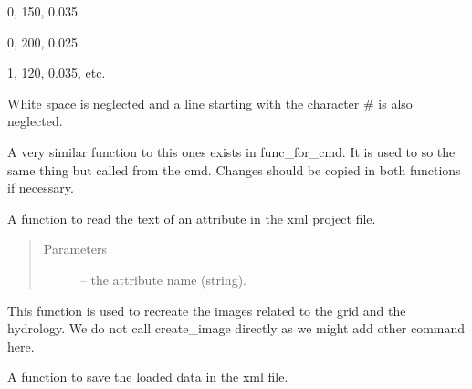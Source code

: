 \documentclass[letterpaper,10pt,english]{sphinxmanual}
\begin{document}
\begin{fulllineitems}
\begin{fulllineitems}
0, 150, 0.035

0, 200, 0.025

1, 120, 0.035, etc.

White space is neglected and a line starting with the character \# is also neglected.

A very similar function to this ones exists in func\_for\_cmd. It is used to so the same thing but called
from the cmd. Changes should be copied in both functions if necessary.

\end{fulllineitems}


\begin{fulllineitems}
\label{\detokenize{index:src_GUI.hydro_GUI_2.SubHydroW.read_attribute_xml}}
A function to read the text of an attribute in the xml project file.
\begin{quote}\begin{description}
\item[{Parameters}] \leavevmode
{} -- the attribute name (string).

\end{description}\end{quote}

\end{fulllineitems}


\begin{fulllineitems}
\label{\detokenize{index:src_GUI.hydro_GUI_2.SubHydroW.recreate_image}}
This function is used to recreate the images related to the grid and the hydrology. We do not call create\_image
directly as we might add other command here.

\end{fulllineitems}


\begin{fulllineitems}
\label{\detokenize{index:src_GUI.hydro_GUI_2.SubHydroW.save_xml}}
A function to save the loaded data in the xml file.


\end{fulllineitems}
\end{fulllineitems}
\end{document}
